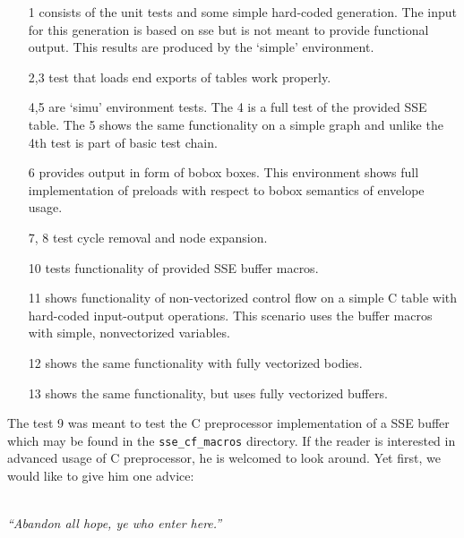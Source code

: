 \begin{enumerate}
  \item[1] consists of the unit tests and some simple hard-coded generation. The input for this generation is based on sse but is not meant to provide functional output. This results are produced by the `simple' environment.
  \item[2,3] test that loads end exports of tables work properly.
  \item[4,5] are `simu' environment tests. The 4 is a full test of the provided SSE table. The 5 shows the same functionality on a simple graph and unlike the 4th test is part of basic test chain.
  \item[6] provides output in form of bobox boxes. This environment shows full implementation of preloads with respect to bobox semantics of envelope usage.
  \item[7, 8] test cycle removal and node expansion.
  \item[10] tests functionality of provided SSE buffer macros.
  \item[11] shows functionality of non-vectorized control flow on a simple C table with hard-coded input-output operations. This scenario uses the buffer macros with simple, nonvectorized variables.
  \item[12] shows the same functionality with fully vectorized bodies.
  \item[13] shows the same functionality, but uses fully vectorized buffers.
\end{enumerate}

The test 9 was meant to test the C preprocessor implementation of a SSE buffer which may be found in the \texttt{sse\_cf\_macros} directory. If the reader is interested in advanced usage of C preprocessor, he is welcomed to look around. Yet first, we would like to give him one advice:
\\ \\ \centerline{\sl{``Abandon all hope, ye who enter here.''}\cite{TODO}}


